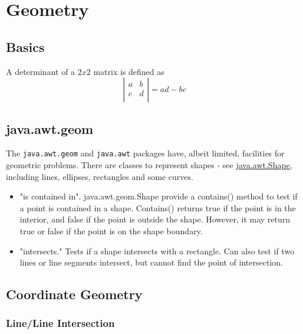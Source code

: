 \chapter{Geometry}

\section{Basics}

A determinant of a $2x2$ matrix is defined as
\[
    \left\vert
        \begin{array}{cc}
            a & b \\
            c & d \\
        \end{array}
    \right\vert
    = a d - b c
\]

\section{java.awt.geom}

The \texttt{java.awt.geom} and \texttt{java.awt} packages have, albeit limited, facilities
for geometric problems.  There are classes to represent shapes - see 
\href{http://docs.oracle.com/javase/6/docs/api/java/awt/Shape.html}{java.awt.Shape}, including
lines, ellipses, rectangles and some curves.

\begin{itemize}
\item "is contained in".  java.awt.geom.Shape provide a contains() method to test if a point
    is contained in a shape.  Contains() returns true if the point is in the interior, and false
    if the point is outside the shape. However, it may return true or false if the point is 
    on the shape boundary.

\item "intersects."  Tests if a shape intersects with a rectangle.
    Can also test if two lines or line segments intersect, but cannot find the point of
    intersection.

\end{itemize}

\section{Coordinate Geometry}

\subsection{Line/Line Intersection}

